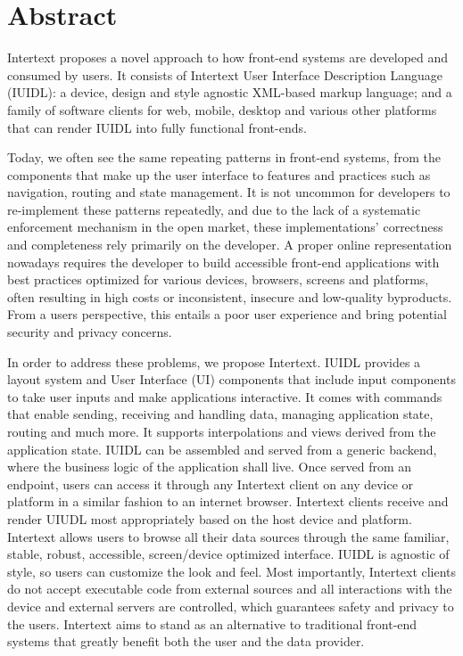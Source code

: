 

\section*{Abstract}

Intertext proposes a novel approach to how front-end systems are developed and consumed by users. It consists of Intertext User Interface Description Language (IUIDL): a device, design and style agnostic XML-based markup language; and a family of software clients for web, mobile, desktop and various other platforms that can render IUIDL into fully functional front-ends.

Today, we often see the same repeating patterns in front-end systems, from the components that make up the user interface to features and practices such as navigation, routing and state management. It is not uncommon for developers to re-implement these patterns repeatedly, and due to the lack of a systematic enforcement mechanism in the open market, these implementations' correctness and completeness rely primarily on the developer. A proper online representation nowadays requires the developer to build accessible front-end applications with best practices optimized for various devices, browsers, screens and platforms, often resulting in high costs or inconsistent, insecure and low-quality byproducts. From a users perspective, this entails a poor user experience and bring potential security and privacy concerns. 

In order to address these problems, we propose Intertext. IUIDL provides a layout system and User Interface (UI) components that include input components to take user inputs and make applications interactive. It comes with commands that enable sending, receiving and handling data, managing application state, routing and much more. It supports interpolations and views derived from the application state. IUIDL can be assembled and served from a generic backend, where the business logic of the application shall live. Once served from an endpoint, users can access it through any Intertext client on any device or platform in a similar fashion to an internet browser. Intertext clients receive and render UIUDL most appropriately based on the host device and platform. Intertext allows users to browse all their data sources through the same familiar, stable, robust, accessible, screen/device optimized interface. IUIDL is agnostic of style, so users can customize the look and feel. Most importantly, Intertext clients do not accept executable code from external sources and all interactions with the device and external servers are controlled, which guarantees safety and privacy to the users. Intertext aims to stand as an alternative to traditional front-end systems that greatly benefit both the user and the data provider.